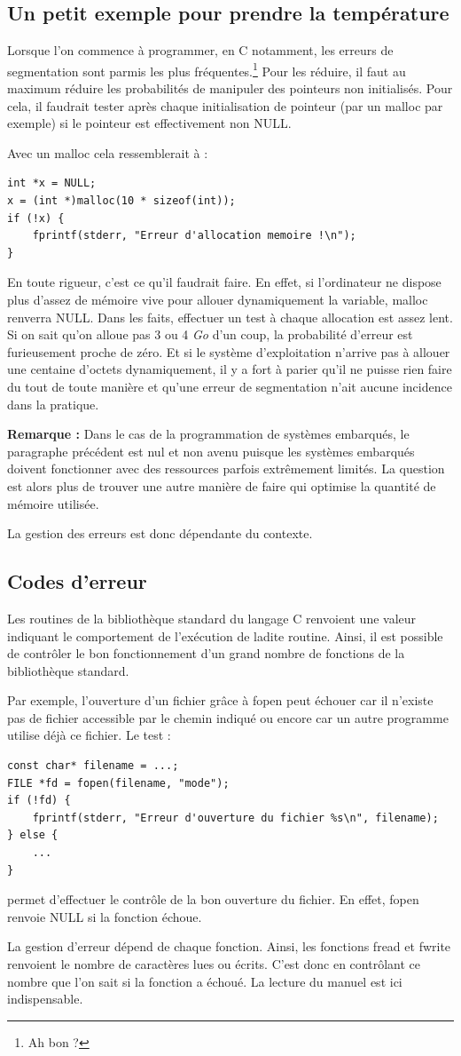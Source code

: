 \documentclass[../../../main.tex]{subfiles}
\begin{document}
\subsection{Un petit exemple pour prendre la température}
Lorsque l'on commence à programmer, en C notamment, les erreurs de segmentation sont parmis
les plus fréquentes.\footnote{Ah bon ?} Pour les réduire, il faut au maximum réduire les probabilités de manipuler des
pointeurs non initialisés. Pour cela, il faudrait tester après chaque initialisation de pointeur (par un
malloc par exemple) si le pointeur est effectivement non \textsf{NULL}.

Avec un malloc cela ressemblerait à :
\begin{verbatim}
int *x = NULL;
x = (int *)malloc(10 * sizeof(int));
if (!x) {
	fprintf(stderr, "Erreur d'allocation memoire !\n");
}
\end{verbatim}
En toute rigueur, c'est ce qu'il faudrait faire. En effet, si l'ordinateur ne dispose plus d'assez de mémoire
vive pour allouer dynamiquement la variable, malloc renverra \textsf{NULL}. Dans les faits, effectuer un test à
chaque allocation est assez lent. Si on sait qu'on alloue pas 3 ou 4 \textit{Go} d'un coup, la probabilité d'erreur
est furieusement proche de zéro. Et si le système d'exploitation n'arrive pas à allouer une centaine
d'octets dynamiquement, il y a fort à parier qu'il ne puisse rien faire du tout de toute manière et
qu'une erreur de segmentation n'ait aucune incidence dans la pratique.

\textbf{Remarque :} Dans le cas de la programmation de systèmes embarqués, le paragraphe précédent
est nul et non avenu puisque les systèmes embarqués doivent fonctionner avec des ressources parfois
extrêmement limités. La question est alors plus de trouver une autre manière de faire qui optimise la
quantité de mémoire utilisée.

La gestion des erreurs est donc dépendante du contexte.
\subsection{Codes d'erreur}
Les routines de la bibliothèque standard du langage C renvoient une valeur indiquant le comportement
de l'exécution de ladite routine. Ainsi, il est possible de contrôler le bon fonctionnement d'un grand nombre de fonctions de la bibliothèque standard.

Par exemple, l'ouverture d'un fichier grâce à \textsf{fopen} peut échouer car il n'existe pas de fichier accessible
par le chemin indiqué ou encore car un autre programme utilise déjà ce fichier. Le test :
\begin{verbatim}
const char* filename = ...;
FILE *fd = fopen(filename, "mode");
if (!fd) {
	fprintf(stderr, "Erreur d'ouverture du fichier %s\n", filename);
} else {
	...
}
\end{verbatim}
permet d'effectuer le contrôle de la bon ouverture du fichier. En effet, \textsf{fopen} renvoie \textsf{NULL} si la fonction
échoue.

La gestion d'erreur dépend de chaque fonction. Ainsi, les fonctions \textsf{fread} et \textsf{fwrite} renvoient le nombre
de caractères lues ou écrits. C'est donc en contrôlant ce nombre que l'on sait si la fonction a échoué.
La lecture du manuel est ici indispensable.
\end{document}
